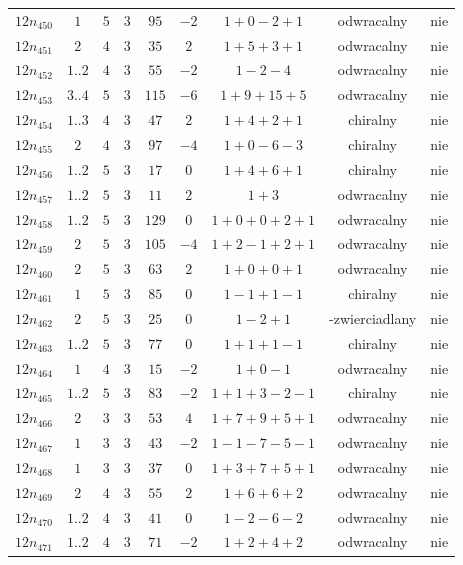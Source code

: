 \begin{longtable}{ccccccccc}
$12n_{450}$ & $1$ & $5$ & $3$ & $95$ & $-2$ & $1+0-2+1$ & odwracalny & nie \\
$12n_{451}$ & $2$ & $4$ & $3$ & $35$ & $2$ & $1+5+3+1$ & odwracalny & nie \\
$12n_{452}$ & $1..2$ & $4$ & $3$ & $55$ & $-2$ & $1-2-4$ & odwracalny & nie \\
$12n_{453}$ & $3..4$ & $5$ & $3$ & $115$ & $-6$ & $1+9+15+5$ & odwracalny & nie \\
$12n_{454}$ & $1..3$ & $4$ & $3$ & $47$ & $2$ & $1+4+2+1$ & chiralny & nie \\
$12n_{455}$ & $2$ & $4$ & $3$ & $97$ & $-4$ & $1+0-6-3$ & chiralny & nie \\
$12n_{456}$ & $1..2$ & $5$ & $3$ & $17$ & $0$ & $1+4+6+1$ & chiralny & nie \\
$12n_{457}$ & $1..2$ & $5$ & $3$ & $11$ & $2$ & $1+3$ & odwracalny & nie \\
$12n_{458}$ & $1..2$ & $5$ & $3$ & $129$ & $0$ & $1+0+0+2+1$ & odwracalny & nie \\
$12n_{459}$ & $2$ & $5$ & $3$ & $105$ & $-4$ & $1+2-1+2+1$ & odwracalny & nie \\
$12n_{460}$ & $2$ & $5$ & $3$ & $63$ & $2$ & $1+0+0+1$ & odwracalny & nie \\
$12n_{461}$ & $1$ & $5$ & $3$ & $85$ & $0$ & $1-1+1-1$ & chiralny & nie \\
$12n_{462}$ & $2$ & $5$ & $3$ & $25$ & $0$ & $1-2+1$ & -zwierciadlany & nie \\
$12n_{463}$ & $1..2$ & $5$ & $3$ & $77$ & $0$ & $1+1+1-1$ & chiralny & nie \\
$12n_{464}$ & $1$ & $4$ & $3$ & $15$ & $-2$ & $1+0-1$ & odwracalny & nie \\
$12n_{465}$ & $1..2$ & $5$ & $3$ & $83$ & $-2$ & $1+1+3-2-1$ & chiralny & nie \\
$12n_{466}$ & $2$ & $3$ & $3$ & $53$ & $4$ & $1+7+9+5+1$ & odwracalny & nie \\
$12n_{467}$ & $1$ & $3$ & $3$ & $43$ & $-2$ & $1-1-7-5-1$ & odwracalny & nie \\
$12n_{468}$ & $1$ & $3$ & $3$ & $37$ & $0$ & $1+3+7+5+1$ & odwracalny & nie \\
$12n_{469}$ & $2$ & $4$ & $3$ & $55$ & $2$ & $1+6+6+2$ & odwracalny & nie \\
$12n_{470}$ & $1..2$ & $4$ & $3$ & $41$ & $0$ & $1-2-6-2$ & odwracalny & nie \\
$12n_{471}$ & $1..2$ & $4$ & $3$ & $71$ & $-2$ & $1+2+4+2$ & odwracalny & nie \\

\end{longtable}
